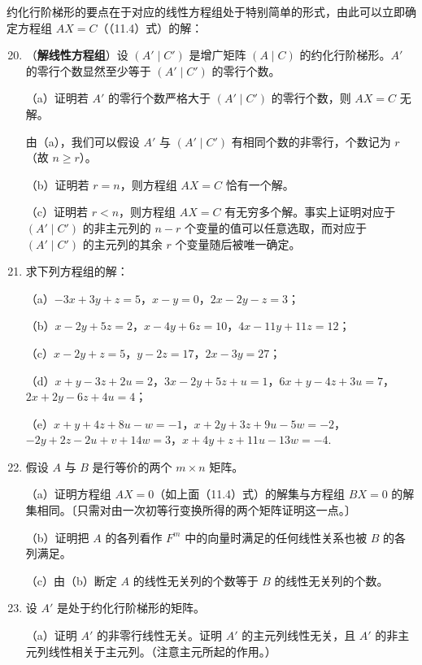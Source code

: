 \noindent 约化行阶梯形的要点在于对应的线性方程组处于特别简单的形式，由此可以立即确定方程组 \(AX = C\)（（11.4）式）的解：

\begin{enumerate}
\setcounter{enumi}{19}
\item （\textbf{解线性方程组}）设 \((A' \mid C')\) 是增广矩阵 \((A \mid C)\) 的约化行阶梯形。\(A'\) 的零行个数显然至少等于 \((A' \mid C')\) 的零行个数。

（a）证明若 \(A'\) 的零行个数严格大于 \((A' \mid C')\) 的零行个数，则 \(AX = C\) 无解。

由（a），我们可以假设 \(A'\) 与 \((A' \mid C')\) 有相同个数的非零行，个数记为 \(r\)（故 \(n \geq r\)）。

（b）证明若 \(r = n\)，则方程组 \(AX = C\) 恰有一个解。

（c）证明若 \(r < n\)，则方程组 \(AX = C\) 有无穷多个解。事实上证明对应于 \((A' \mid C')\) 的非主元列的 \(n-r\) 个变量的值可以任意选取，而对应于 \((A' \mid C')\) 的主元列的其余 \(r\) 个变量随后被唯一确定。

\item 求下列方程组的解：

（a）\(-3x+3y+z = 5\)，\(x-y = 0\)，\(2x-2y-z = 3\)；

（b）\(x-2y+5z = 2\)，\(x-4y+6z = 10\)，\(4x-11y+11z = 12\)；

（c）\(x-2y+z = 5\)，\(y-2z = 17\)，\(2x-3y = 27\)；

（d）\(x+y-3z+2u = 2\)，\(3x-2y+5z+u = 1\)，\(6x+y-4z+3u = 7\)，\(2x+2y-6z+4u = 4\)；

（e）\(x+y+4z+8u-w = -1\)，\(x+2y+3z+9u-5w = -2\)，\(-2y+2z-2u+v+14w = 3\)，\(x+4y+z+11u-13w = -4\).

\item 假设 \(A\) 与 \(B\) 是行等价的两个 \(m \times n\) 矩阵。

（a）证明方程组 \(AX = 0\)（如上面（11.4）式）的解集与方程组 \(BX = 0\) 的解集相同。〔只需对由一次初等行变换所得的两个矩阵证明这一点。〕

（b）证明把 \(A\) 的各列看作 \(F^m\) 中的向量时满足的任何线性关系也被 \(B\) 的各列满足。

（c）由（b）断定 \(A\) 的线性无关列的个数等于 \(B\) 的线性无关列的个数。

\item 设 \(A'\) 是处于约化行阶梯形的矩阵。

（a）证明 \(A'\) 的非零行线性无关。证明 \(A'\) 的主元列线性无关，且 \(A'\) 的非主元列线性相关于主元列。（注意主元所起的作用。）


\end{enumerate}

